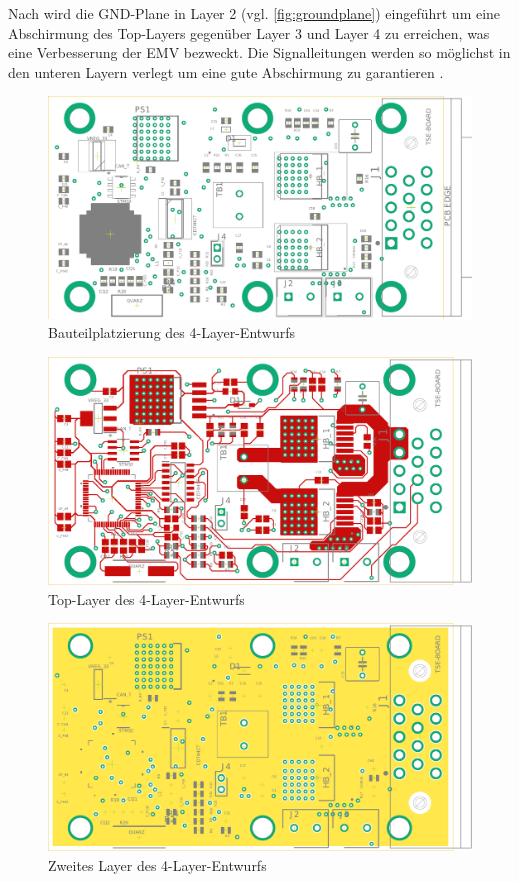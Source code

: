 Nach \cite{Franz2012} wird die GND-Plane in Layer 2 (vgl. \autoref{fig:groundplane}) eingeführt um eine Abschirmung des Top-Layers gegenüber Layer 3 und Layer 4 zu erreichen, was eine Verbesserung der EMV bezweckt. Die Signalleitungen werden so möglichst in den unteren Layern verlegt um eine gute Abschirmung zu garantieren \cite{emcdes}.
\newpage
\begin{figure}[H]%
\centering
\includegraphics[angle=-90,width=0.7\columnwidth]{./Bilder/doc4layer}%
\caption{Bauteilplatzierung des 4-Layer-Entwurfs}%
\label{}%
\end{figure}\newpage
\begin{figure}[H]%
\centering
\includegraphics[angle=-90,width=0.7\columnwidth]{./Bilder/top4layer}%
\caption{Top-Layer des 4-Layer-Entwurfs}%
\label{}%
\end{figure}\newpage
\begin{figure}[H]%
\centering
\includegraphics[angle=-90,width=0.7\columnwidth]{./Bilder/2route4layer}%
\caption{Zweites Layer des 4-Layer-Entwurfs}%
\label{fig:groundplane}%
\end{figure}\newpage
